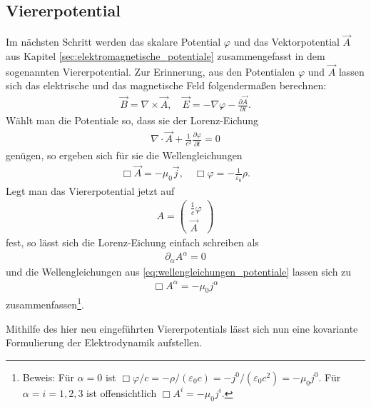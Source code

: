 \subsection{Viererpotential}

Im nächsten Schritt werden das skalare Potential $\varphi$ und das Vektorpotential $\vec A$ aus Kapitel \ref{sec:elektromagnetische_potentiale} zusammengefasst in dem sogenannten Viererpotential.
Zur Erinnerung, aus den Potentialen $\varphi$ und $\vec A$ lassen sich das elektrische und das magnetische Feld folgendermaßen berechnen:
\begin{align*}
    \vec B = \nabla\times \vec A, \quad \vec E=-\nabla\varphi-\frac{\partial\vec A}{\partial t}.
\end{align*}
Wählt man die Potentiale so, dass sie der Lorenz-Eichung
\begin{align*}
    \nabla\cdot\vec A +\frac{1}{c^2}\frac{\partial\varphi}{\partial t}=0
\end{align*}
genügen, so ergeben sich für sie die Wellengleichungen
\begin{align}
    \label{eq:wellengleichungen_potentiale}
    \Box\vec A=-\mu_0\vec j, \quad \Box \varphi=-\frac{1}{\varepsilon_0}\rho.
\end{align}
Legt man das Viererpotential jetzt auf
\begin{align*}
    \boxed{A= \begin{pmatrix}
                      \frac{1}{c}\varphi \\
                      \vec A
                  \end{pmatrix}
    }
\end{align*}
fest, so lässt sich die Lorenz-Eichung einfach schreiben als
\begin{align}
    \label{eq:lorentz_eichung_kovariant}
    \boxed{\partial_\alpha A^\alpha=0}
\end{align}
und die Wellengleichungen aus \eqref{eq:wellengleichungen_potentiale} lassen sich zu
\begin{align}
    \label{eq:wellengleichungen_potential_kovariant}
    \boxed{\Box A^\alpha=-\mu_0 j^\alpha}
\end{align}
zusammenfassen\footnote{Beweis: Für $\alpha=0$ ist $\Box\varphi/c=-\rho/(\varepsilon_0c)=-j^0/(\varepsilon_0c^2)=-\mu_0j^0$. Für $\alpha=i=1,2,3$ ist offensichtlich $\Box A^i=-\mu_0 j^i$. }.

Mithilfe des hier neu eingeführten Viererpotentials lässt sich nun eine kovariante Formulierung der Elektrodynamik aufstellen.



